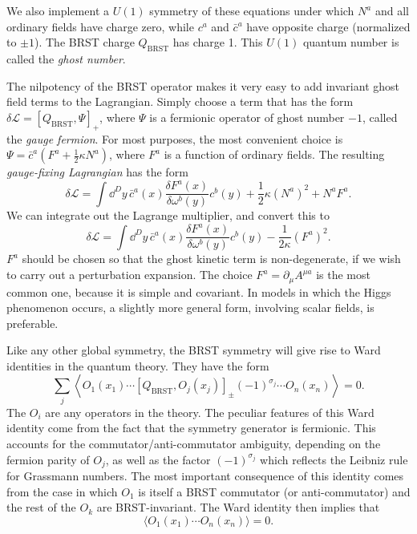 We also implement a $U(1)$ symmetry of these equations under which $N^a$ and
all ordinary fields have charge zero, while $c^a$ and $\bar c^a$ have opposite
charge (normalized to $\pm1$). The BRST charge $Q_{\mathrm{BRST}}$ has charge
1. This $U(1)$ quantum number is called the \emph{ghost number}.

The nilpotency of the BRST operator makes it very easy to add invariant ghost
field terms to the Lagrangian. Simply choose a term that has the form
$\delta\mathcal L=[Q_{\mathrm{BRST}},\Psi]_+$, where $\Psi$ is a fermionic
operator of ghost number $-1$, called the \emph{gauge fermion}. For most
purposes, the most convenient choice is
$\Psi=\bar c^a(F^a+\frac12\kappa N^a)$, where $F^a$ is a function of ordinary
fields. The resulting \emph{gauge-fixing Lagrangian} has the form
\begin{equation*}
  \delta\mathcal L=\int\dd^D y\,\bar c^a(x)
  \frac{\delta F^a(x)}{\delta\omega^b(y)}c^b(y)
  +\frac12\kappa(N^a)^2+N^aF^a.
\end{equation*}
We can integrate out the Lagrange multiplier, and convert this to
\begin{equation*}
  \delta\mathcal L=\int\dd^D y\,\bar c^a(x)
  \frac{\delta F^a(x)}{\delta\omega^b(y)}c^b(y)
  -\frac{1}{2\kappa}(F^a)^2.
\end{equation*}
$F^a$ should be chosen so that the ghost kinetic term is non-degenerate, if we
wish to carry out a perturbation expansion. The choice
$F^a=\partial_\mu A^{\mu a}$ is the most common one, because it is simple and
covariant. In models in which the Higgs phenomenon occurs, a slightly more
general form, involving scalar fields, is preferable.

Like any other global symmetry, the BRST symmetry will give rise to Ward
identities in the quantum theory. They have the form
\begin{equation*}
  \sum_j\left\langle O_1(x_1)\cdots[Q_{\mathrm{BRST}},O_j(x_j)]_{\pm}
  (-1)^{\sigma_j}\cdots O_n(x_n)\right\rangle=0.
\end{equation*}
The $O_i$ are any operators in the theory. The peculiar features of this Ward
identity come from the fact that the symmetry generator is fermionic. This
accounts for the commutator/anti-commutator ambiguity, depending on the fermion
parity of $O_j$, as well as the factor $(-1)^{\sigma_j}$ which reflects the
Leibniz rule for Grassmann numbers. The most important consequence of this
identity comes from the case in which $O_1$ is itself a BRST commutator (or
anti-commutator) and the rest of the $O_k$ are BRST-invariant. The Ward identity
then implies that
\begin{equation*}
  \langle O_1(x_1)\cdots O_n(x_n)\rangle=0.
\end{equation*}

